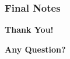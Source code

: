 \documentclass[compress,oilve]{beamer}
\begin{document}

\frametitle{Final Notes}
\centering
\vspace{50 pt}
\textbf{Thank You!}
\vspace{50pt}

\textbf{Any Question?}
\end{document}
